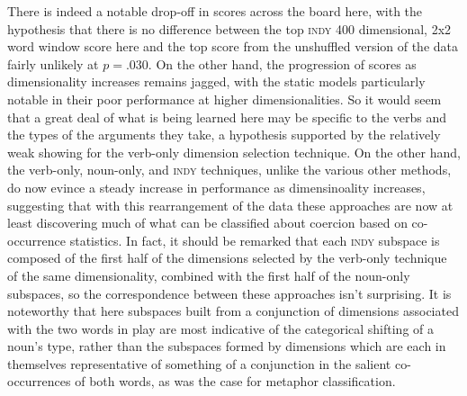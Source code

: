 There is indeed a notable drop-off in scores across the board here, with the hypothesis that there is no difference between the top \textsc{indy} 400 dimensional, 2x2 word window score here and the top score from the unshuffled version of the data fairly unlikely at $p = .030$.  On the other hand, the progression of scores as dimensionality increases remains jagged, with the static models particularly notable in their poor performance at higher dimensionalities.  So it would seem that a great deal of what is being learned here may be specific to the verbs and the types of the arguments they take, a hypothesis supported by the relatively weak showing for the verb-only dimension selection technique.  On the other hand, the verb-only, noun-only, and \textsc{indy} techniques, unlike the various other methods, do now evince a steady increase in performance as dimensinoality increases, suggesting that with this rearrangement of the data these approaches are now at least discovering much of what can be classified about coercion based on co-occurrence statistics.  In fact, it should be remarked that each \textsc{indy} subspace is composed of the first half of the dimensions selected by the verb-only technique of the same dimensionality, combined with the first half of the noun-only subspaces, so the correspondence between these approaches isn't surprising.  It is noteworthy that here subspaces built from a conjunction of dimensions associated with the two words in play are most indicative of the categorical shifting of a noun's type, rather than the subspaces formed by dimensions which are each in themselves representative of something of a conjunction in the salient co-occurrences of both words, as was the case for metaphor classification.


